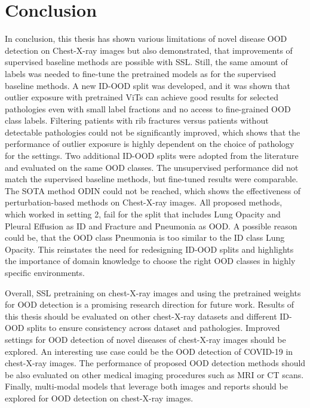 \section{Conclusion}
In conclusion, this thesis has shown various limitations of novel disease OOD detection on Chest-X-ray images but also demonstrated, that improvements of supervised baseline methods are possible with SSL. 
Still, the same amount of labels was needed to fine-tune the pretrained models as for the supervised baseline methods.
A new ID-OOD split was developed, and it was shown that outlier exposure with pretrained ViTs can achieve good results for selected pathologies even with small label fractions and no access to fine-grained OOD class labels.
Filtering patients with rib fractures versus patients without detectable pathologies could not be significantly improved, which shows that the performance of outlier exposure is highly dependent on the choice of pathology for the settings.
Two additional ID-OOD splits were adopted from the literature and evaluated on the same OOD classes.
The unsupervised performance did not match the supervised baseline methods, but fine-tuned results were comparable.
The SOTA method ODIN could not be reached, which shows the effectiveness of perturbation-based methods on Chest-X-ray images.
All proposed methods, which worked in setting 2, fail for the split that includes Lung Opacity and Pleural Effusion as ID and Fracture and Pneumonia as OOD.
A possible reason could be, that the OOD class Pneumonia is too similar to the ID class Lung Opacity.
This reinstates the need for redesigning ID-OOD splits and highlights the importance of domain knowledge to choose the right OOD classes in highly specific environments.
\par 
Overall, SSL pretraining on chest-X-ray images and using the pretrained weights for OOD detection is a promising research direction for future work.
Results of this thesis should be evaluated on other chest-X-ray datasets and different ID-OOD splits to ensure consistency across dataset and pathologies.
Improved settings for OOD detection of novel diseases of chest-X-ray images should be explored.
An interesting use case could be the OOD detection of COVID-19 in chest-X-ray images.
The performance of proposed OOD detection methods should be also evaluated on other medical imaging procedures such as MRI or CT scans.
Finally, multi-modal models that leverage both images and reports should be explored for OOD detection on chest-X-ray images.